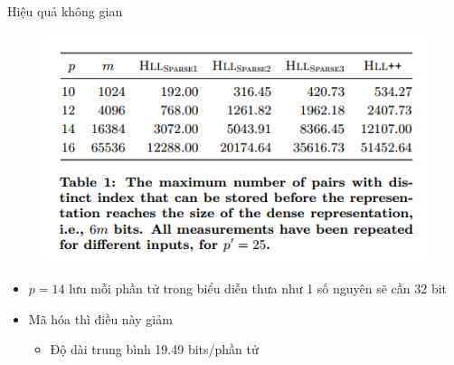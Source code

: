 \documentclass{beamer}
\begin{document}
\begin{frame}{Hiệu quả không gian}
\begin{figure}[H]
\includegraphics[scale=0.5]{img3.png}
\end{figure}
\begin{itemize}
\item $p = 14$ lưu mỗi phần tử trong biểu diễn thưa như 1 số nguyên sẽ cần 32 bit
\item Mã hóa thì điều này giảm 
\begin{itemize}
\item Độ dài trung bình 19.49 bits/phần tử
\end{itemize}
\end{itemize}
\end{frame}
\end{document}
